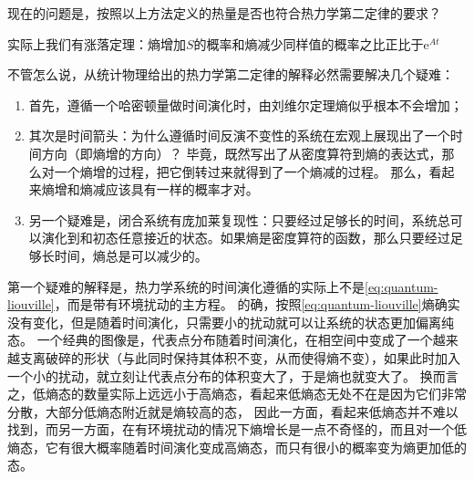 \documentclass[hyperref, UTF8, a4paper]{ctexart}
\newcommand*{\ee}{\mathrm{e}}
\begin{document}
现在的问题是，按照以上方法定义的热量是否也符合热力学第二定律的要求？

实际上我们有涨落定理：熵增加$S$的概率和熵减少同样值的概率之比正比于$\ee^{At}$

不管怎么说，从统计物理给出的热力学第二定律的解释必然需要解决几个疑难：
\begin{enumerate}
    \item 首先，遵循一个哈密顿量做时间演化时，由刘维尔定理熵似乎根本不会增加；
    \item 其次是时间箭头：为什么遵循时间反演不变性的系统在宏观上展现出了一个时间方向（即熵增的方向）？
    毕竟，既然写出了从密度算符到熵的表达式，那么对一个熵增的过程，把它倒转过来就得到了一个熵减的过程。
    那么，看起来熵增和熵减应该具有一样的概率才对。
    \item 另一个疑难是，闭合系统有庞加莱复现性：只要经过足够长的时间，系统总可以演化到和初态任意接近的状态。如果熵是密度算符的函数，那么只要经过足够长时间，熵总是可以减少的。
\end{enumerate}

第一个疑难的解释是，热力学系统的时间演化遵循的实际上不是\eqref{eq:quantum-liouville}，而是带有环境扰动的主方程。
的确，按照\eqref{eq:quantum-liouville}熵确实没有变化，但是随着时间演化，只需要小的扰动就可以让系统的状态更加偏离纯态。
一个经典的图像是，代表点分布随着时间演化，在相空间中变成了一个越来越支离破碎的形状（与此同时保持其体积不变，从而使得熵不变），如果此时加入一个小的扰动，就立刻让代表点分布的体积变大了，于是熵也就变大了。
换而言之，低熵态的数量实际上远远小于高熵态，看起来低熵态无处不在是因为它们非常分散，大部分低熵态附近就是熵较高的态，
因此一方面，看起来低熵态并不难以找到，而另一方面，在有环境扰动的情况下熵增长是一点不奇怪的，而且对一个低熵态，它有很大概率随着时间演化变成高熵态，而只有很小的概率变为熵更加低的态。
\end{document}
